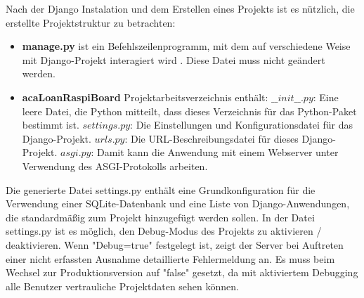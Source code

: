 Nach der Django Instalation und dem Erstellen eines Projekts ist es nützlich, die erstellte Projektstruktur zu betrachten\cite{website:16}:

\begin{itemize}
	\item \textbf{manage.py} ist ein Befehlszeilenprogramm, mit dem auf verschiedene Weise mit  Django-Projekt interagiert wird . Diese Datei muss nicht geändert werden.
	
	\item \textbf{acaLoanRaspiBoard} Projektarbeitsverzeichnis enthält:
	\subitem \textbf{$\_\_init\_\_.py$}: Eine leere Datei, die Python mitteilt, dass dieses Verzeichnis für das Python-Paket bestimmt ist.
	\subitem \textbf{$settings.py$}: Die Einstellungen und Konfigurationsdatei für das Django-Projekt.
	\subitem \textbf{$urls.py$}: Die URL-Beschreibungsdatei für dieses Django-Projekt.
	\subitem \textbf{$asgi.py$}: Damit kann die Anwendung mit einem Webserver unter Verwendung des ASGI-Protokolls arbeiten.
\end{itemize}
Die generierte Datei settings.py enthält eine Grundkonfiguration für die Verwendung einer SQLite-Datenbank und eine Liste von Django-Anwendungen, die standardmäßig zum Projekt hinzugefügt werden sollen. In der Datei settings.py ist es möglich, den Debug-Modus des Projekts zu aktivieren / deaktivieren. Wenn "Debug=true" festgelegt ist, zeigt der Server  bei Auftreten einer nicht erfassten Ausnahme detaillierte Fehlermeldung an. Es muss beim Wechsel zur Produktionsversion auf "false" gesetzt, da mit aktiviertem Debugging alle Benutzer vertrauliche Projektdaten sehen können. 

